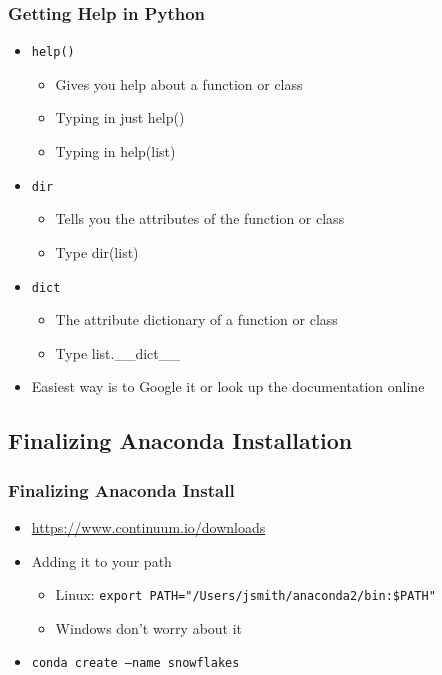 \documentclass[mini frame in current subsection]{beamer}
\begin{document}
		\begin{frame}
			\frametitle{Getting Help in Python}
			\begin{itemize}
				\vfill \item  \texttt{help()}
					\begin{itemize}
						\item  Gives you help about a function or class
						\item  Typing in just help()
						\item  Typing in help(list)
					\end{itemize}
				\vfill \item  \texttt{dir}
					\begin{itemize}
						\item  Tells you the attributes of the function or class
						\item  Type dir(list)
					\end{itemize}
				\vfill \item  \texttt{dict}
					\begin{itemize}
						\item  The attribute dictionary of a function or class
						\item  Type list.\_\_dict\_\_
					\end{itemize}
				\vfill \item  Easiest way is to Google it or look up the documentation online
			\end{itemize}
		\end{frame}
		
	\subsection{Finalizing Anaconda Installation}
	
		\begin{frame}
			\frametitle{Finalizing Anaconda Install}
			\begin{itemize}
				\vfill \item  \url{https://www.continuum.io/downloads}
				\vfill \item  Adding it to your path
					\begin{itemize}
						\item Linux:  \texttt{export PATH="/Users/jsmith/anaconda2/bin:\$PATH"}
						\item Windows don't worry about it
					\end{itemize}
				\vfill \item  \texttt{conda create --name snowflakes}
			\end{itemize}
		\end{frame}
		
\end{document}
